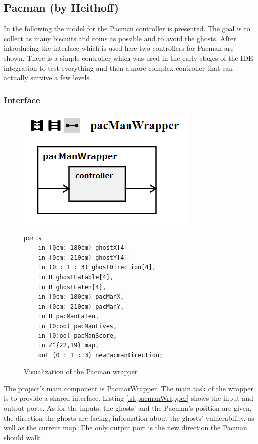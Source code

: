 \subsection{Pacman (by Heithoff)}
In the following the model for the Pacman controller is presented. The goal is to collect as many biscuits and coins as possible and to avoid the ghosts. After introducing the interface which is used here two controllers for Pacman are shown. There is a simple controller which was used in the early stages of the IDE integration to test everything and then a more complex controller that can actually survive a few levels.

\subsubsection{Interface}
\begin{figure}[t!]
	\caption{Visualization of the Pacman wrapper}
	\label{fig:visPacmanWrapper}
	\centering
	\includegraphics[scale=0.7]{pictures/VisualizationPacmanWrapper.png}

\begin{lstlisting}[label=lst:pacmanWrapper, caption=Interface of the Pacman Wrapper, language=EMAM]
ports 
	in (0cm: 180cm) ghostX[4],
	in (0cm: 210cm) ghostY[4],
	in (0 : 1 : 3) ghostDirection[4],
	in B ghostEatable[4],
	in B ghostEaten[4],
	in (0cm: 180cm) pacManX,
	in (0cm: 210cm) pacManY,
	in B pacManEaten,
	in (0:oo) pacManLives,
	in (0:oo) pacManScore,
	in Z^{22,19} map,
	out (0 : 1 : 3) newPacmanDirection;
\end{lstlisting}
\end{figure}
The project's main component is PacmanWrapper. The main task of the wrapper is to provide a shared interface. Listing \ref{lst:pacmanWrapper} shows the input and output ports. As for the inputs, the ghosts' and the Pacman's position are given, the direction the ghosts are facing, information about the ghosts' vulnerability, as well as the current map. The only output port is the new direction the Pacman should walk. \newline
